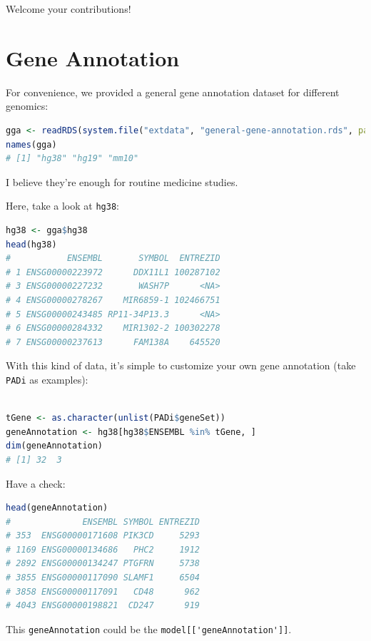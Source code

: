 \documentclass[
  12pt,
]{book}
\newcommand{\passthrough}[1]{#1}
\begin{document}
Welcome your contributions!

\hypertarget{gene-annotation}{%
\section{Gene Annotation}\label{gene-annotation}}

For convenience, we provided a general gene annotation dataset for different genomics:

\begin{lstlisting}[language=R]
gga <- readRDS(system.file("extdata", "general-gene-annotation.rds", package = "GSClassifier"))
names(gga)
# [1] "hg38" "hg19" "mm10"
\end{lstlisting}

I believe they're enough for routine medicine studies.

Here, take a look at \passthrough{\lstinline!hg38!}:

\begin{lstlisting}[language=R]
hg38 <- gga$hg38
head(hg38)
#           ENSEMBL       SYMBOL  ENTREZID
# 1 ENSG00000223972      DDX11L1 100287102
# 3 ENSG00000227232       WASH7P      <NA>
# 4 ENSG00000278267    MIR6859-1 102466751
# 5 ENSG00000243485 RP11-34P13.3      <NA>
# 6 ENSG00000284332    MIR1302-2 100302278
# 7 ENSG00000237613      FAM138A    645520
\end{lstlisting}

With this kind of data, it's simple to customize your own gene annotation (take \passthrough{\lstinline!PADi!} as examples):

\begin{lstlisting}[language=R]

tGene <- as.character(unlist(PADi$geneSet))
geneAnnotation <- hg38[hg38$ENSEMBL %in% tGene, ]
dim(geneAnnotation)
# [1] 32  3
\end{lstlisting}

Have a check:

\begin{lstlisting}[language=R]
head(geneAnnotation)
#              ENSEMBL SYMBOL ENTREZID
# 353  ENSG00000171608 PIK3CD     5293
# 1169 ENSG00000134686   PHC2     1912
# 2892 ENSG00000134247 PTGFRN     5738
# 3855 ENSG00000117090 SLAMF1     6504
# 3858 ENSG00000117091   CD48      962
# 4043 ENSG00000198821  CD247      919
\end{lstlisting}

This \passthrough{\lstinline!geneAnnotation!} could be the \passthrough{\lstinline!model[['geneAnnotation']]!}.
\end{document}
